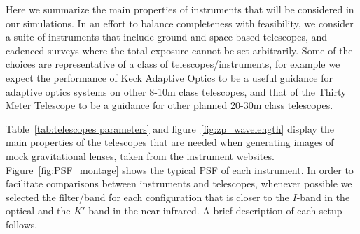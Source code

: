 \documentclass[a4paper,11pt]{article}
\begin{document}
Here we summarize the main properties of instruments that will be
considered in our simulations. In an effort to balance completeness
with feasibility, we consider a suite of instruments that include
ground and space based telescopes, and cadenced surveys where the
total exposure cannot be set arbitrarily. Some of the choices are
representative of a class of telescopes/instruments, for example we
expect the performance of Keck Adaptive Optics to be a useful guidance
for adaptive optics systems on other 8-10m class telescopes, and that
of the Thirty Meter Telescope to be a guidance for other planned
20-30m class telescopes.

Table~\ref{tab:telescopes parameters} and
figure~\ref{fig:zp_wavelength} display the main properties of the
telescopes that are needed when generating images of mock
gravitational lenses, taken from the instrument
websites. Figure~\ref{fig:PSF_montage} shows the typical PSF of each
instrument. In order to facilitate comparisons between instruments and
telescopes, whenever possible we selected the filter/band for each
configuration that is closer to the $I$-band in the optical and the
$K'$-band in the near infrared. A brief description of each setup
follows.
\end{document}
